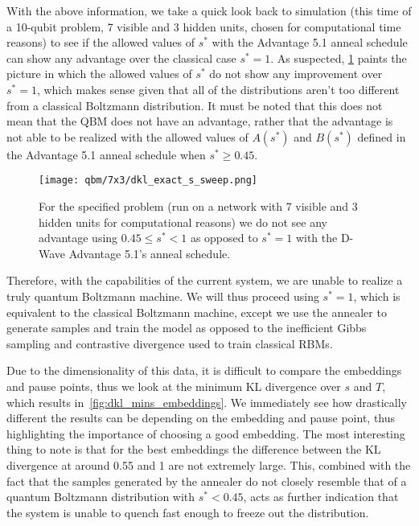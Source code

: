 With the above information, we take a quick look back to simulation (this time of a 10-qubit problem, 7 visible and 3 hidden units, chosen for computational time reasons) to see if the allowed values of \( s^* \) with the Advantage 5.1 anneal schedule can show any advantage over the classical case \( s^* = 1 \).
As suspected, \cref{fig:s_sweep_exact} paints the picture in which the allowed values of \( s^* \) do not show any improvement over \( s^* = 1 \), which makes sense given that all of the distributions aren't too different from a classical Boltzmann distribution.
It must be noted that this does not mean that the QBM does not have an advantage, rather that the advantage is not able to be realized with the allowed values of \( A(s^*) \) and \( B(s^*) \) defined in the Advantage 5.1 anneal schedule when \( s^* \ge 0.45 \).
\begin{figure}[!htb]
    \begin{center}
        \texttt{[image: qbm/7x3/dkl\_exact\_s\_sweep.png]}
    \end{center}
    \caption{For the specified problem (run on a network with 7 visible and 3 hidden units for computational reasons) we do not see any advantage using \( 0.45 \le s^* < 1 \) as opposed to \( s^* = 1 \) with the D-Wave Advantage 5.1's anneal schedule.}
    \label{fig:s_sweep_exact}
\end{figure}

Therefore, with the capabilities of the current system, we are unable to realize a truly quantum Boltzmann machine.
We will thus proceed using \( s^* = 1 \), which is equivalent to the classical Boltzmann machine, except we use the annealer to generate samples and train the model as opposed to the inefficient Gibbs sampling and contrastive divergence used to train classical RBMs.

Due to the dimensionality of this data, it is difficult to compare the embeddings and pause points, thus we look at the minimum KL divergence over \( s \) and \( T \), which results in~\cref{fig:dkl_mins_embeddings}.
We immediately see how drastically different the results can be depending on the embedding and pause point, thus highlighting the importance of choosing a good embedding.
The most interesting thing to note is that for the best embeddings the difference between the KL divergence at around 0.55 and 1 are not extremely large.
This, combined with the fact that the samples generated by the annealer do not closely resemble that of a quantum Boltzmann distribution with \( s^* < 0.45 \), acts as further indication that the system is unable to quench fast enough to freeze out the distribution.

